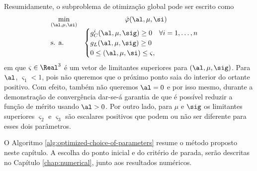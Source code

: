 Resumidamente, o subproblema de otimização global pode ser escrito como
\begin{equation}
	\begin{array}{lc}
\displaystyle \min_{(\al,\mu,\si)} & \hat\varphi(\al,\mu,\si) \\
\text{s. a.} &\begin{cases} g_C^i(\al,\mu,\sig) \geq 0 \quad \forall i = 1,\ldots,n \\
				g_L(\al,\mu,\sig)   \geq 0 	\\
				 0\leq (\al,\mu,\si) \leq \varsigma,
				 	
				 \end{cases}\
\end{array}
\label{eq:pop-subproblem}
\end{equation}
em que   $\varsigma\in\Real^3$ é um vetor de limitantes superiores para  $(\al,\mu,\sig)$. Para
$\al$, $\varsigma_1<1$, pois  não queremos que o próximo ponto saia do interior do ortante positivo. Com efeito, também não queremos $\al=0$ e por isso mesmo,  durante a
demonstração de convergência dar-se-á garantia de que é possível reduzir a
função de mérito usando $\al>0$.
Por outro lado, para $\mu$ e $\sig$ os limitantes superiores $\varsigma_{2}$ e $\varsigma_{3}$ são escalares positivos que podem ou não ser diferente para esses dois parâmetros.

 
O Algoritmo \ref{alg:optimized-choice-of-parameters} resume o método proposto neste capítulo. A escolha do ponto inicial e do critério de parada, serão descritas no Capítulo \ref{chap:numerical}, junto aos resultados numéricos.

